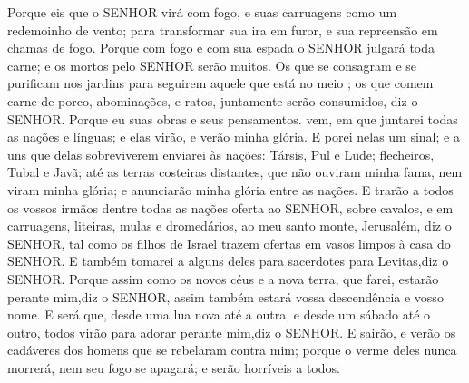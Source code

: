 {Porque eis que o SENHOR virá com fogo, e suas carruagens como um redemoinho de vento; para transformar sua ira em furor, e sua repreensão em chamas de fogo.
Porque com fogo e com sua espada o SENHOR julgará toda carne; e os mortos pelo SENHOR serão muitos.
Os que se consagram e se purificam nos jardins para seguirem aquele
 que está no meio
{} ; os que comem carne de porco, abominações, e ratos, juntamente serão consumidos, diz o SENHOR.
Porque eu
{} suas obras e seus pensamentos.
{} vem, em que juntarei todas as nações e línguas; e elas virão, e verão minha glória.
E porei nelas um sinal; e a uns que delas sobreviverem enviarei às nações:
{} Társis, Pul e Lude;
{} flecheiros,
{} Tubal e Javã; até as terras costeiras
{} distantes, que não ouviram minha fama, nem viram minha glória; e anunciarão minha glória entre as nações.
E trarão a todos os vossos irmãos dentre todas as nações
{} oferta ao SENHOR, sobre cavalos, e em carruagens, liteiras, mulas e dromedários, ao meu santo monte,
{} Jerusalém, diz o SENHOR, tal como os filhos de Israel trazem ofertas em vasos limpos à casa do SENHOR.
E também tomarei a alguns deles para
{} sacerdotes
{} para Levitas,diz o SENHOR.
Porque assim como os novos céus e a nova terra, que farei, estarão perante mim,diz o SENHOR, assim também estará vossa descendência
 e vosso nome.
E será que, desde uma lua nova até a outra, e desde um sábado até o outro, todos
 virão para adorar perante mim,diz o SENHOR.
E sairão, e verão os cadáveres dos homens que se rebelaram contra mim; porque o verme deles nunca morrerá, nem seu fogo se apagará; e serão horríveis a todos.\par }